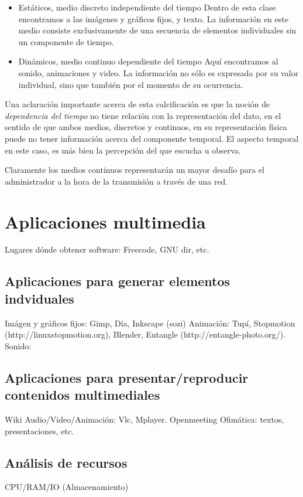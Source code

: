 \documentclass[12pt]{article}
\begin{document}
\begin{itemize}
\item{Estáticos, medio discreto independiente del tiempo}
Dentro de esta clase encontramos a las imágenes y gráficos fijos, y texto. La información 
en este medio consiste exclusivamente de una secuencia de elementos individuales 
sin un componente de tiempo.
\item{Dinámicos, medio continuo dependiente del tiempo}
Aquí encontramos al sonido, animaciones y video. La información no sólo es 
expresada por su valor individual, sino que también por el momento 
de su ocurrencia.
\end{itemize}

Una aclaración importante acerca de esta calcificación es que la noción 
de {\it dependencia del tiempo} no tiene relación con la representación
del dato, en el sentido de que ambos medios, discretos y continuos, en su 
representación física puede no tener información acerca del componente 
temporal. El aspecto temporal en este caso, es más bien la percepción del 
que escucha u observa.\cite{ramyer}  

Claramente los medios continuos representarán un mayor desafío para el 
administrador a la hora de la transmisión a través de una red.   

\section*{Aplicaciones multimedia}

Lugares dónde obtener software: Freecode, GNU dir, etc. 

\subsection*{Aplicaciones para generar elementos indviduales}
Imágen y gráficos fijos: Gimp, Día, Inkscape (sozi)
Animación: Tupí, Stopmotion (http://linuxstopmotion.org), Blender, 
Entangle (http://entangle-photo.org/).
Sonido:  

\subsection*{Aplicaciones para presentar/reproducir contenidos multimediales}
Wiki
Audio/Video/Animación: Vlc, Mplayer. 
Openmeeting
Ofimática: textos, presentaciones, etc. 

\subsection{Análisis de recursos}
CPU/RAM/IO (Almacenamiento)
\end{document}
